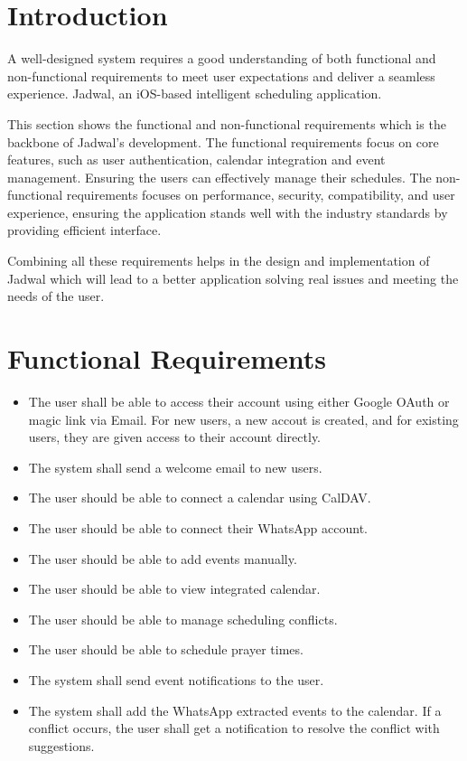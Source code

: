 \documentclass[12pt,a4paper]{report}
\begin{document}
\section{Introduction}

A well-designed system requires a good understanding of both functional and non-functional requirements to meet user expectations and deliver a seamless experience. Jadwal, an iOS-based intelligent scheduling application. 

This section shows the functional and non-functional requirements which is the backbone of Jadwal's development. The functional requirements focus on core features, such as user authentication, calendar integration and event management. Ensuring the users can effectively manage their schedules. The non-functional requirements focuses on performance, security, compatibility, and user experience, ensuring the application stands well with the industry standards by providing efficient interface.

Combining all these requirements helps in the design and implementation of Jadwal which will lead to a better application solving real issues and meeting the needs of the user.


\section{Functional Requirements}

\begin{itemize}
    \item The user shall be able to access their account using either Google OAuth or magic link via Email. For new users, a new accout is created, and for existing users, they are given access to their account directly.
    \item The system shall send a welcome email to new users.
    \item The user should be able to connect a calendar using CalDAV.
    \item The user should be able to connect their WhatsApp account.
    \item The user should be able to add events manually.
    \item The user should be able to view integrated calendar.
    \item The user should be able to manage scheduling conflicts.
    \item The user should be able to schedule prayer times.
    \item The system shall send event notifications to the user.
    \item The system shall add the WhatsApp extracted events to the calendar. If a conflict occurs, the user shall get a notification to resolve the conflict with suggestions.
\end{itemize}
\end{document}
